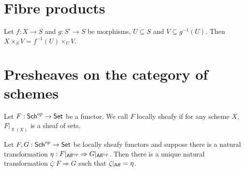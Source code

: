 \documentclass{memoir}
\begin{document}
\section{Fibre products}
\begin{proposition}
    Let $f:X\to S$ and $g:S'\to S$ be morphisms, $U\subseteq S$ and $V\subseteq g^{-1}(U)$.
    Then $X\times_SV = f^{-1}(U)\times_UV$.
\end{proposition}
\section{Presheaves on the category of schemes}
\begin{definition}
    Let $F:{\normalfont\mathsf{Sch}}^{op}\to {\normalfont\mathsf{Set}}$ be a functor.
    We call $F$ locally sheafy if for any scheme $X$, $F|_{\Top(X)}$ is a sheaf of sets.
\end{definition}
\begin{thm}
    Let $F,G:{\normalfont\mathsf{Sch}}^{op}\to {\normalfont\mathsf{Set}}$ be locally sheafy functors and suppose there is a natural transformation $\eta:F|_{{\normalfont\mathsf{Aff}}^{op}}\Rightarrow G|_{{\normalfont\mathsf{Aff}}^{op}}$.
    Then there is a unique natural transformation $\zeta:F\Rightarrow G$ such that $\zeta|_{{\normalfont\mathsf{Aff}}} = \eta$.
\end{thm}
\end{document}
